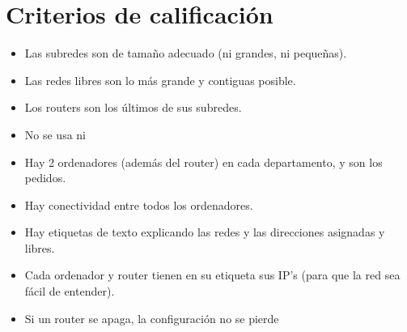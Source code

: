 \section{Criterios de calificación}
\begin{itemize}
\item Las subredes son de tamaño adecuado (ni grandes, ni pequeñas).
\item Las redes libres son lo más grande y contiguas posible.
\item Los routers son los últimos de sus subredes.
\item No se usa \texttt{} ni \texttt{}
\item Hay 2 ordenadores (además del router) en cada departamento, y son los pedidos.
\item Hay conectividad entre todos los ordenadores.
\item Hay etiquetas de texto explicando las redes y las direcciones asignadas y libres.
\item Cada ordenador y router tienen en su etiqueta sus IP’s (para que la red sea fácil de entender).
\item Si un router se apaga, la configuración no se pierde
\end{itemize}


